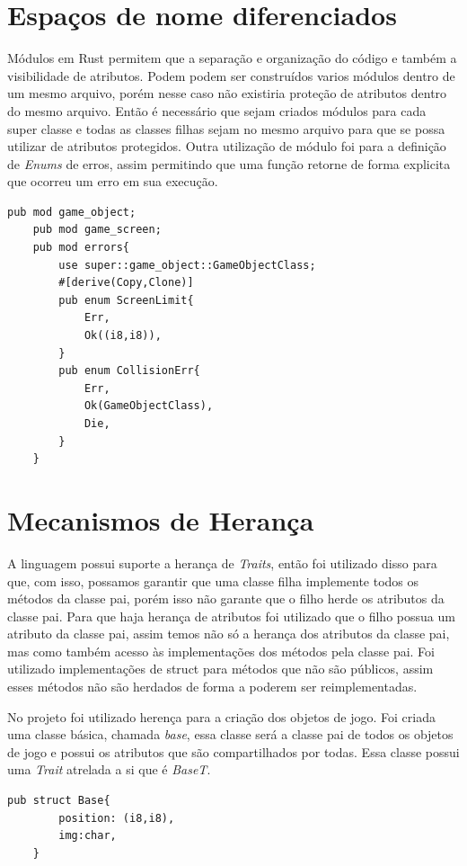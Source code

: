 \documentclass[rel_mlp]{iiufrgs}
\begin{document}
 
 \section{Espaços de nome diferenciados}
 Módulos em Rust permitem que a separação e organização do código e também a visibilidade de atributos. Podem  podem ser construídos varios módulos dentro de um mesmo arquivo, porém nesse caso não existiria proteção de atributos dentro do mesmo arquivo. Então é necessário que sejam criados módulos para cada super classe e todas as classes filhas sejam no mesmo arquivo para que se possa utilizar de atributos protegidos. Outra utilização de módulo foi para a definição de \textit{Enums} de erros, assim permitindo que uma função retorne de forma explicita que ocorreu um erro em sua execução.
 
 \begin{lstlisting}[frame= single]
    pub mod game_object;
    pub mod game_screen;
    pub mod errors{
        use super::game_object::GameObjectClass;
        #[derive(Copy,Clone)]
        pub enum ScreenLimit{
            Err,
            Ok((i8,i8)),
        }
        pub enum CollisionErr{
            Err,
            Ok(GameObjectClass),
            Die,
        }
    }
 \end{lstlisting}
 
 \section{Mecanismos de Herança}
 A linguagem possui suporte a herança de \textit{Traits}, então foi utilizado disso para que, com isso, possamos garantir que uma classe filha implemente todos os métodos da classe pai, porém isso não garante que o filho herde os atributos da classe pai. Para que haja herança de atributos foi utilizado que o filho possua um atributo da classe pai, assim temos não só a herança dos atributos da classe pai, mas como também acesso às implementações dos métodos pela classe pai. Foi utilizado implementações de struct para métodos que não são públicos, assim esses métodos não são herdados de forma a poderem ser reimplementadas.
 
No projeto foi utilizado herença para a criação dos objetos de jogo. Foi criada uma classe básica, chamada \textit{base}, essa classe será a classe pai de todos os objetos de jogo e possui os atributos que são compartilhados por todas. Essa classe possui uma \textit{Trait} atrelada a si que é \textit{BaseT}.

\begin{lstlisting}[frame = single]
    pub struct Base{
        position: (i8,i8),
        img:char,
    }
\end{lstlisting}
\end{document}
